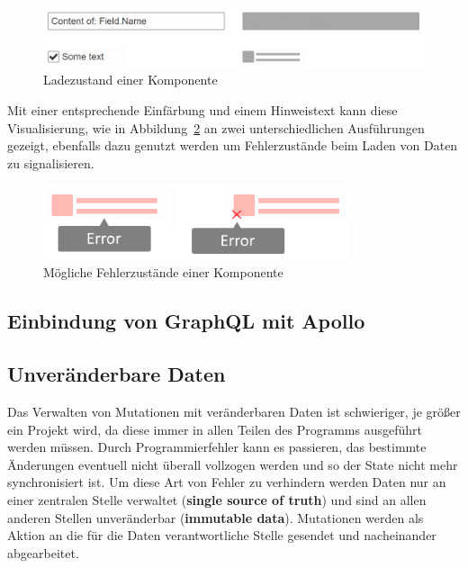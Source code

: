 \begin{figure}
    \centering
    \captionsetup{justification=centering}
    \includegraphics[width=\textwidth]{figures/comp_loading_final_comparison.png}
        \caption{Ladezustand einer Komponente}\label{fig:comp_loading_final_comparison}
\end{figure}

Mit einer entsprechende Einfärbung und einem Hinweistext kann diese Visualisierung, wie in Abbildung~\ref{fig:comp_possible_error_state} an zwei unterschiedlichen Ausführungen gezeigt, ebenfalls dazu genutzt werden um Fehlerzustände beim Laden von Daten zu signalisieren.

\begin{figure}
    \centering
    \captionsetup{justification=centering}
    \includegraphics[width=0.8\textwidth]{figures/comp_possible_error_state.png}
        \caption{Mögliche Fehlerzustände einer Komponente}\label{fig:comp_possible_error_state}
\end{figure}

\subsection{Einbindung von GraphQL mit Apollo}

\subsection{Unveränderbare Daten}
Das Verwalten von Mutationen mit veränderbaren Daten ist schwieriger, je größer ein Projekt wird, da diese immer in allen Teilen des Programms ausgeführt werden müssen. Durch Programmierfehler kann es passieren, das bestimmte Änderungen eventuell nicht überall vollzogen werden und so der State nicht mehr synchronisiert ist. Um diese Art von Fehler zu verhindern werden Daten nur an einer zentralen Stelle verwaltet (\textbf{single source of truth}) und sind an allen anderen Stellen unveränderbar (\textbf{immutable data}). Mutationen werden als Aktion an die für die Daten verantwortliche Stelle gesendet und nacheinander abgearbeitet.


